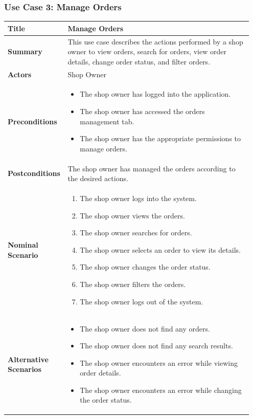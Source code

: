 \subsubsection{Use Case 3: Manage Orders}
\begin{longtable}{|p{0.2\linewidth}|p{0.75\linewidth}|}
\hline
\textbf{Title} & Manage Orders \\
\hline
\textbf{Summary} & This use case describes the actions performed by a shop owner to view orders, search for orders, view order details, change order status, and filter orders. \\
\hline
\textbf{Actors} & Shop Owner \\
\hline
\textbf{Preconditions} & 
\begin{itemize}
    \item The shop owner has logged into the application.
    \item The shop owner has accessed the orders management tab.
    \item The shop owner has the appropriate permissions to manage orders.
\end{itemize} \\
\hline
\textbf{Postconditions} & The shop owner has managed the orders according to the desired actions. \\
\hline
\textbf{Nominal Scenario} &
\begin{enumerate}
    \item The shop owner logs into the system.
    \item The shop owner views the orders.
    \item The shop owner searches for orders.
    \item The shop owner selects an order to view its details.
    \item The shop owner changes the order status.
    \item The shop owner filters the orders.
    \item The shop owner logs out of the system.
\end{enumerate} \\
\hline
\textbf{Alternative Scenarios} &
\begin{itemize}
    \item The shop owner does not find any orders.
    \item The shop owner does not find any search results.
    \item The shop owner encounters an error while viewing order details.
    \item The shop owner encounters an error while changing the order status.
\end{itemize} \\
\hline
\end{longtable}

